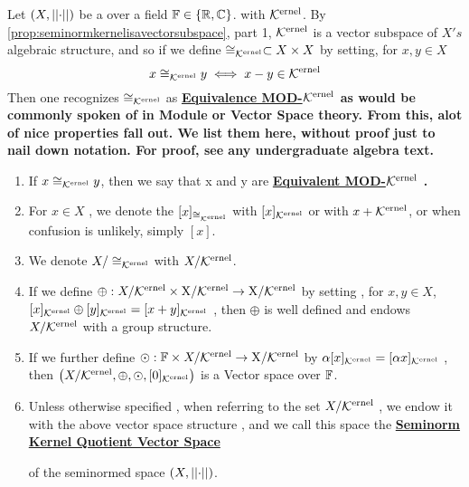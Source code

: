 \label{def:equivalencemodseminormkernel}
\newcommand{\EquivelanceModKernel}[0]{
    \bf \hyperref[def:equivalencemodseminormkernel]{Equivalence MOD-$\Ker$} \rm
}

\newcommand{\EquivalentModKernel}[0]{
    \bf \hyperref[def:equivalencemodseminormkernel]{Equivalent MOD-$\Ker$} \rm
}
\newcommand{\SeminormKernelQuotientVectorSpace}[0]{
    \bf \hyperref[def:equivalencemodseminormkernel]{Seminorm Kernel Quotient Vector Space} \rm
}

\begin{df}
Let $(X,\left|\left| \cdot \right|\right|)$ be a \SeminormedSpace over a field $\mathbb{F} \in \{\mathbb{R},\mathbb{C}\}$.
with \SeminormKernel $\bf\mathcal{K}\rm^{ernel}$.
By \ref{prop:seminormkernelisavectorsubspace}, part 1, 
$\bf\mathcal{K}\rm^{ernel}$ is a vector subspace of $X's$ algebraic structure, and so if we define 
$\cong_{\bf\mathcal{K}\rm^{ernel}} \subset X \times X$ by setting, for $x,y \in X$
\begin{equation}
x \cong_{\bf\mathcal{K}\rm^{ernel}} y \iff x-y \in \bf\mathcal{K}\rm^{ernel}
\end{equation}
Then one recognizes $\cong_{\bf\mathcal{K}\rm^{ernel}}$ as \EquivelanceModKernel as would be commonly spoken of in Module or Vector Space theory. 
From this, alot of nice properties fall out. We list them here, without proof just to nail down notation. 
For proof, see any undergraduate algebra text.
\begin{enumerate}
\item If $x \cong_{\bf\mathcal{K}\rm^{ernel}} y$, then we say that x and y are \EquivalentModKernel. 
\item For $x \in X$
    , we denote the \EquivalenceClass $[x]_{\cong_{\bf\mathcal{K}\rm^{ernel}}}$ with 
    $[x]_{\bf\mathcal{K}\rm^{ernel}}$ or 
    with $x+\bf\mathcal{K}\rm^{ernel}$, or 
    when confusion is unlikely, simply $[x]$. 
\item We denote $X/\cong_{\bf\mathcal{K}\rm^{ernel}}$ with $X/\bf\mathcal{K}\rm^{ernel}$. 
\item If we define $\oplus:X/\bf\mathcal{K}\rm^{ernel} \times X/\bf\mathcal{K}\rm^{ernel} \to X/\bf\mathcal{K}\rm^{ernel}$ by setting
    , for $x,y \in X$, $[x]_{\bf\mathcal{K}\rm^{ernel}}\oplus[y]_{\bf\mathcal{K}\rm^{ernel}}=[x+y]_{\bf\mathcal{K}\rm^{ernel}}$
    , then $\oplus$ is well defined and endows $X/\bf\mathcal{K}\rm^{ernel}$ with a group structure. 
\item If we further define $\odot:\mathbb{F} \times X/\bf\mathcal{K}\rm^{ernel} \to X/\bf\mathcal{K}\rm^{ernel}$ by 
    $\alpha [x]_{\bf\mathcal{K}\rm^{ernel}}=[\alpha x]_{\bf\mathcal{K}\rm^{ernel}}$
    , then $\left( X/\bf\mathcal{K}\rm^{ernel}, \oplus, \odot, [0]_{\bf\mathcal{K}\rm^{ernel}}\right)$ is a Vector space over $\mathbb{F}$. 
\item Unless otherwise specified
    , when referring to the set $X/\bf\mathcal{K}\rm^{ernel}$
    , we endow it with the above vector space structure
    , and we call this space the \SeminormKernelQuotientVectorSpace 
    of the seminormed space $(X, \left|\left| \cdot \right|\right|)$.
\end{enumerate}
\end{df}

